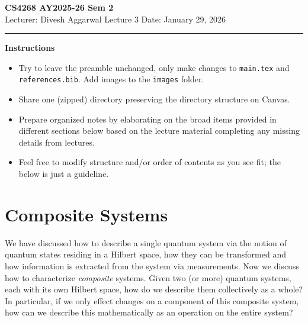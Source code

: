 



% 


\newpage
\noindent
\textbf{CS4268 AY2025-26 Sem 2}
\\
\noindent
Lecturer: Divesh Aggarwal
\hfill
Lecture 3                      %
\hfill
Date: January 29, 2026          %


\noindent
\rule{\textwidth}{1pt}

\medskip


\textbf{Instructions}\\
\begin{itemize}
    \item Try to leave the preamble unchanged, only make changes to \texttt{main.tex} and  \texttt{references.bib}. Add images to the \texttt{images} folder. 
    \item Share one (zipped) directory preserving the directory structure on Canvas. 
    \item Prepare organized notes by elaborating on the broad items provided in different sections below based on the lecture material completing any missing details from lectures.
    \item Feel free to modify structure and/or order of contents as you see fit; the below is just a guideline.
\end{itemize} 

\section{Composite Systems}
We have discussed how to describe a single quantum system via the notion of quantum states residing in a Hilbert space, how they can be transformed and how information is extracted from the system via measurements. Now we discuss how to characterize \textit{composite} systems. Given two (or more) quantum systems, each with its own Hilbert space, how do we describe them collectively as a whole? In particular, if we only effect changes on a component of this composite system, how can we describe this mathematically as an operation on the entire system? 

